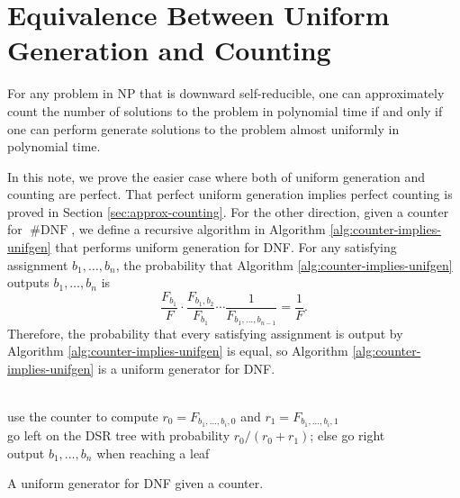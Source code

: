 \documentclass[letterpaper, reqno,11pt]{article}
\DeclareMathOperator{\shDNF}{\# DNF}
\begin{document}
\section{Equivalence Between Uniform Generation and Counting}

\begin{theorem}
  For any problem in NP that is downward self-reducible, one can approximately count the number of solutions to the problem in polynomial time if and only if one can perform generate solutions to the problem almost uniformly in polynomial time.
\end{theorem}

In this note, we prove the easier case where both of uniform generation and counting are perfect. That perfect uniform generation implies perfect counting is proved in Section \ref{sec:approx-counting}. For the other direction, given a counter for $\shDNF$, we define a recursive algorithm in Algorithm \ref{alg:counter-implies-unifgen} that performs uniform generation for DNF. For any satisfying assignment $b_1, \ldots, b_n$, the probability that Algorithm \ref{alg:counter-implies-unifgen} outputs $b_1, \ldots, b_n$ is
$$ \frac{F_{b_1}}{F} \cdot \frac{F_{b_1, b_2}}{F_{b_1}} \cdots \frac{1}{F_{b_1, \ldots, b_{n - 1}}} = \frac{1}{F}. $$
Therefore, the probability that every satisfying assignment is output by Algorithm \ref{alg:counter-implies-unifgen} is equal, so Algorithm \ref{alg:counter-implies-unifgen} is a uniform generator for DNF.

\begin{algorithm}
   \\
  use the counter to compute $r_0 = F_{b_1, \ldots, b_i, 0}$ and $r_1 = F_{b_1, \ldots, b_i, 1}$ \\
  go left on the DSR tree with probability $r_0/(r_0 + r_1)$; else go right \\
  output $b_1, \ldots, b_n$ when reaching a leaf
  \caption{A uniform generator for DNF given a counter.}
  \label{alg:counter-implies-unifgen}
\end{algorithm}
\end{document}
